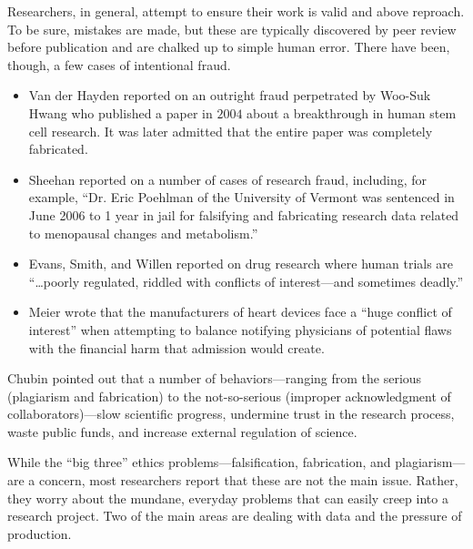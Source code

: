Researchers, in general, attempt to ensure their work is valid and above reproach. To be sure, mistakes are made, but these are typically discovered by peer review before publication and are chalked up to simple human error. There have been, though, a few cases of intentional fraud.

\begin{itemize}
	\item Van der Hayden reported on an outright fraud perpetrated by Woo-Suk Hwang who published a paper in $ 2004 $ about a breakthrough in human stem cell research. It was later admitted that the entire paper was completely fabricated\cite{van2009fraud}.

	\item Sheehan reported on a number of cases of research fraud\cite{sheehan2007fraud}, including, for example, ``Dr. Eric Poehlman of the University of Vermont was sentenced in June 2006 to 1 year in jail for falsifying and fabricating research data related to menopausal changes and metabolism.''

	\item Evans, Smith, and Willen reported on drug research where human trials are ``\ldots poorly regulated, riddled with conflicts of interest---and sometimes deadly.''\cite{evans2005secret}

	\item Meier wrote that the manufacturers of heart devices face a ``huge conflict of interest'' when attempting to balance notifying physicians of potential flaws with the financial harm that admission would create\cite{meier2005maker}.

\end{itemize}

Chubin pointed out that a number of behaviors---ranging from the serious (plagiarism and fabrication) to the not-so-serious (improper acknowledgment of collaborators)---slow scientific progress, undermine trust in the research process, waste public funds, and increase external regulation of science\cite{chubin1985research}.

While the ``big three'' ethics problems---falsification, fabrication, and plagiarism---are a concern, most researchers report that these are not the main issue. Rather, they worry about the mundane, everyday problems that can easily creep into a research project. Two of the main areas are dealing with data and the pressure of production\cite{de2006normal}.

